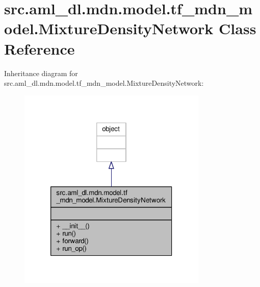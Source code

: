 \hypertarget{classsrc_1_1aml__dl_1_1mdn_1_1model_1_1tf__mdn__model_1_1_mixture_density_network}{\section{src.\-aml\-\_\-dl.\-mdn.\-model.\-tf\-\_\-mdn\-\_\-model.\-Mixture\-Density\-Network Class Reference}
\label{classsrc_1_1aml__dl_1_1mdn_1_1model_1_1tf__mdn__model_1_1_mixture_density_network}
}


Inheritance diagram for src.\-aml\-\_\-dl.\-mdn.\-model.\-tf\-\_\-mdn\-\_\-model.\-Mixture\-Density\-Network\-:\nopagebreak
\begin{figure}[H]
\begin{center}
\leavevmode
\includegraphics[width=256pt]{classsrc_1_1aml__dl_1_1mdn_1_1model_1_1tf__mdn__model_1_1_mixture_density_network__inherit__graph}
\end{center}
\end{figure}


